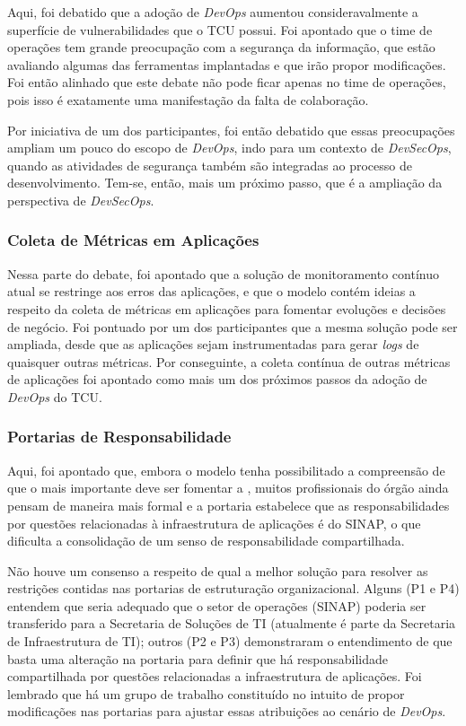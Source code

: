 Aqui, foi debatido que a adoção de {\it DevOps} aumentou consideravalmente a
superfície de vulnerabilidades que o \acrshort{TCU} possui. Foi apontado que
o time de operações tem grande preocupação com a segurança da informação, que
estão avaliando algumas das ferramentas implantadas e que irão propor
modificações. Foi então alinhado que este debate não pode ficar apenas no time
de operações, pois isso é exatamente uma manifestação da falta de colaboração.

Por iniciativa de um dos participantes, foi então debatido que essas preocupações
ampliam um pouco do escopo de {\it DevOps}, indo para um contexto de {\it DevSecOps},
quando as atividades de segurança também são integradas ao processo de
desenvolvimento. Tem-se, então, mais um próximo passo, que é a ampliação da
perspectiva de {\it DevSecOps}.

\subsubsection{Coleta de Métricas em Aplicações}

Nessa parte do debate, foi apontado que a solução de monitoramento contínuo
atual se restringe aos erros das aplicações, e que o modelo contém ideias a
respeito da coleta de métricas em aplicações para fomentar evoluções e decisões
de negócio. Foi pontuado por um dos participantes que a mesma solução pode ser
ampliada, desde que as aplicações sejam instrumentadas para gerar {\it logs} de
quaisquer outras métricas. Por conseguinte, a coleta contínua de outras métricas
de aplicações foi apontado como mais um dos próximos passos da adoção de
{\it DevOps} do \acrshort{TCU}.

\subsubsection{Portarias de Responsabilidade}

Aqui, foi apontado que, embora o modelo tenha possibilitado a compreensão de que
o mais importante deve ser fomentar a , muitos
profissionais do órgão ainda pensam de maneira mais formal e a portaria
estabelece que as responsabilidades por questões relacionadas à infraestrutura
de aplicações é do \acrshort{SINAP}, o que dificulta a consolidação de um senso
de responsabilidade compartilhada.

Não houve um consenso a respeito de qual a melhor solução para resolver as
restrições contidas nas portarias de estruturação organizacional. Alguns (P1 e P4)
entendem que seria adequado que o setor de operações (\acrshort{SINAP}) poderia
ser transferido para a Secretaria de Soluções de \acrshort{TI} (atualmente é
parte da Secretaria de Infraestrutura de \acrshort{TI}); outros (P2 e P3)
demonstraram o entendimento de que basta uma alteração na portaria para definir
que há responsabilidade compartilhada por questões relacionadas a infraestrutura
de aplicações. Foi lembrado que há um grupo de trabalho constituído no intuito
de propor modificações nas portarias para ajustar essas atribuições ao
cenário de {\it DevOps}.

